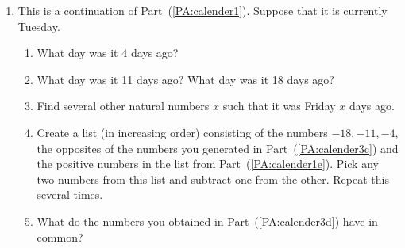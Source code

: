 \begin{previewactivity}
\begin{enumerate}
  \item This is a continuation of Part~(\ref{PA:calender1}).  Suppose that it is currently Tuesday.
  \begin{enumerate}
    \item What day was it 4 days ago?
    \item What day was it 11 days ago?  What day was it 18 days ago?
    \item Find several other natural numbers  $x$  such that it was Friday  $x$  days ago.  \label{PA:calender3c}%
    \item Create a list (in increasing order) consisting of the numbers 
\linebreak
$-18, -11, -4$, the opposites of the numbers you generated in Part~(\ref{PA:calender3c}) and the positive numbers in the list from Part~(\ref{PA:calender1e}).  Pick any two numbers from this list and subtract one from the other.  Repeat this several times.
\label{PA:calender3d}%
    \item What do the numbers you obtained in Part~(\ref{PA:calender3d}) have in common?
  \end{enumerate}
%
\end{enumerate}
\end{previewactivity}
\hbreak


\endinput

